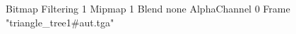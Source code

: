 {Bitmap
	{Filtering 1}
	{Mipmap 1}
	{Blend none}
	{AlphaChannel 0}
	{Frame "triangle_tree1#aut.tga"}
}
